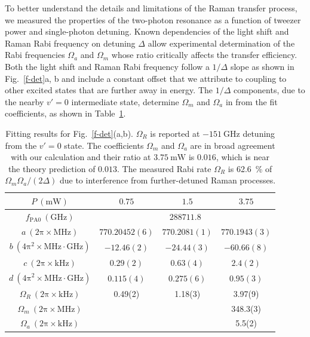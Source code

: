 \documentclass[aps,prl,twocolumn,10pt,superscriptaddress]{revtex4-1}
\begin{document}
To better understand the details and limitations of the Raman transfer process, we measured the properties of the two-photon resonance as a function of tweezer power and single-photon detuning.
Known dependencies of the light shift and Raman Rabi frequency on detuning $\Delta$ allow experimental determination of the Rabi frequencies
$ \Omega_a $ and $\Omega_m$ whose ratio critically affects the transfer efficiency.
Both the light shift and Raman Rabi frequency follow a $1/\Delta$ slope as shown in Fig.~\ref{f-det}a, b and include a constant offset that we attribute to coupling to other excited states that are further away in energy.
The $1/\Delta$ components, due to the nearby $v'=0$ intermediate state, determine $\Omega_m $ and $ \Omega_a $ in from the fit coefficients, as shown in Table~\ref{tab:f-det:fit}.

\begin{table}[ht]
  \centering
  \begin{tabular}{|c|c|c|c|}
    $P~(\mathrm{mW})$&$0.75$&$1.5$&$3.75$\\\hline
    $f_{\mathrm{PA}0}~(\mathrm{GHz})$&\multicolumn{3}{|c|}{$288711.8$}\\\hline
    $a~(\mathrm{2\pi\times MHz})$&$770.20452(6)$&$770.2081(1)$&$770.1943(3)$\\
    $b~(\mathrm{4\pi^2\times MHz\cdot GHz})$&$-12.46(2)$&$-24.44(3)$&$-60.66(8)$\\\hline
    $c~(\mathrm{2\pi\times kHz})$&$0.29(2)$&$0.63(4)$&$2.4(2)$\\
    $d~(\mathrm{4\pi^2\times MHz\cdot GHz})$&$0.115(4)$&$0.275(6)$&$0.95(3)$\\ \hline
    $\Omega_R~(\mathrm{2\pi\times kHz})$ & 0.49(2) & 1.18(3) & 3.97(9) \\
    $\Omega_m~(\mathrm{2\pi\times MHz})$ & & & 348.3(3) \\
    $\Omega_a~(\mathrm{2\pi\times kHz})$ & & & 5.5(2)
  \end{tabular}
  \caption{Fitting results for Fig.~\ref{f-det}(a,b). $\Omega_R$ is reported at $-151~\mathrm{GHz}$ detuning from the $v' = 0$ state.  The coefficients $\Omega_m$ and $\Omega_a$ are in broad agreement with our calculation and their ratio at $3.75~\mathrm{mW}$ is $0.016$, which is near the theory prediction of $0.013$.  The measured Rabi rate $\Omega_R$ is 62.6~\% of $\Omega_m \Omega_a/(2\Delta)$ due to interference from further-detuned Raman processes.
    \label{tab:f-det:fit}}
\end{table}
\end{document}
